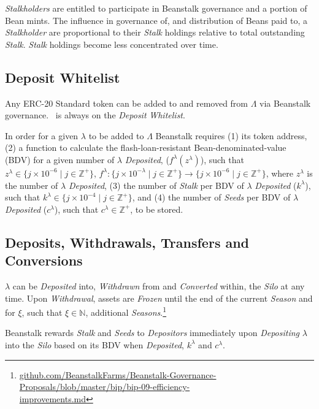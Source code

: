 \documentclass[tikz]{article}
\newcommand{\term}[1]{\textsl{#1}}
\newcommand{\Bean}{} %
\begin{document}
\term{Stalkholders} are entitled to participate in Beanstalk governance and a portion of Bean mints. The influence in governance of, and distribution of Beans paid to, a \term{Stalkholder} are proportional to their \term{Stalk} holdings relative to total outstanding \term{Stalk}. \term{Stalk} holdings become less concentrated over time.

\subsection{Deposit Whitelist}
Any ERC-20 Standard token can be added to and removed from $\Lambda$ via Beanstalk governance. \Bean\ is always on the \term{Deposit} \term{Whitelist}.

\newpage
In order for a given $\lambda$ to be added to $\Lambda$ Beanstalk requires (1) its token address, (2) a function to calculate the flash-loan-resistant Bean-denominated-value (BDV) for a given number of $\lambda$ \term{Deposited}, ($f^{\lambda}(z^{\lambda})$), such that $z^{\lambda} \in \{j \times 10^{-6} \mid j \in \mathbb{Z}^{+} \}$, $f^{\lambda}\colon \{j \times 10^{-\lambda} \mid j \in \mathbb{Z}^{+} \} \rightarrow \{j \times 10^{-6} \mid j \in \mathbb{Z}^{+} \}$, where $z^{\lambda}$ is the number of $\lambda$ \term{Deposited}, (3) the number of \term{Stalk} per BDV of $\lambda$ \term{Deposited} ($k^{\lambda}$), such that $k^{\lambda} \in \{j \times 10^{-4} \mid j \in \mathbb{Z}^{+} \}$, and (4) the number of \term{Seeds} per BDV of $\lambda$ \term{Deposited} ($c^{\lambda}$), such that $c^{\lambda} \in \mathbb{Z}^{+}$, to be stored.

\subsection{Deposits, Withdrawals, Transfers and Conversions}
$\lambda$ can be \term{Deposited} into, \term{Withdrawn} from and \term{Converted} within, the \term{Silo} at any time. Upon \term{Withdrawal}, assets are \term{Frozen} until the end of the current \term{Season} and for $\xi$, such that $\xi \in \mathbb{N}$, additional \term{Seasons}.\footnote{\href{https://github.com/BeanstalkFarms/Beanstalk-Governance-Proposals/blob/master/bip/bip-09-efficiency-improvements.md}{github.com/BeanstalkFarms/Beanstalk-Governance-Proposals/blob/master/bip/bip-09-efficiency-\\improvements.md}}

Beanstalk rewards \term{Stalk} and \term{Seeds} to \term{Depositors} immediately upon \term{Depositing} $\lambda$ into the \term{Silo} based on its BDV when \term{Deposited}, $k^{\lambda}$ and $c^{\lambda}$.
\end{document}
